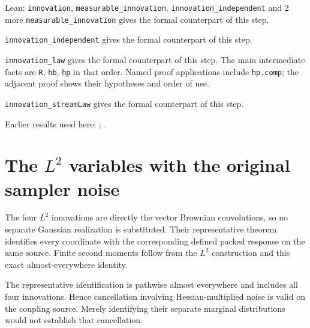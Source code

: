 \documentclass[11pt,a4paper]{article}
\begin{document}
\begin{leanbox}{Lean: \texttt{innovation}, \texttt{measurable\_\allowbreak{}innovation}, \texttt{innovation\_\allowbreak{}independent} and 2 more}
\texttt{measurable\_\allowbreak{}innovation} gives the formal counterpart of this step.




\texttt{innovation\_\allowbreak{}independent} gives the formal counterpart of this step.




\texttt{innovation\_\allowbreak{}law} gives the formal counterpart of this step. The main intermediate facts are \texttt{R}, \texttt{hb}, \texttt{hp} in that order. Named proof applications include \texttt{hp.\allowbreak{}comp}; the adjacent proof shows their hypotheses and order of use.




\texttt{innovation\_\allowbreak{}stream\allowbreak{}Law} gives the formal counterpart of this step.
\end{leanbox}


Earlier results used here: \cite[Section~3.8.16]{LangevinLean2026ULASC}; \cite[Section~3.8.17]{LangevinLean2026ULASC}.

\section{\texorpdfstring{The \(L^{2}\) variables with the original sampler noise}{The L² variables with the original sampler noise}}


The four \(L^{2}\) innovations are directly the vector Brownian convolutions, so no separate Gaussian realization is substituted. Their representative theorem identifies every coordinate with the corresponding defined packed response on the same source. Finite second moments follow from the \(L^{2}\) construction and this exact almost-everywhere identity.



The representative identification is pathwise almost everywhere and includes all four innovations. Hence cancellation involving Hessian-multiplied noise is valid on the coupling source. Merely identifying their separate marginal distributions would not establish that cancellation.
\end{document}
